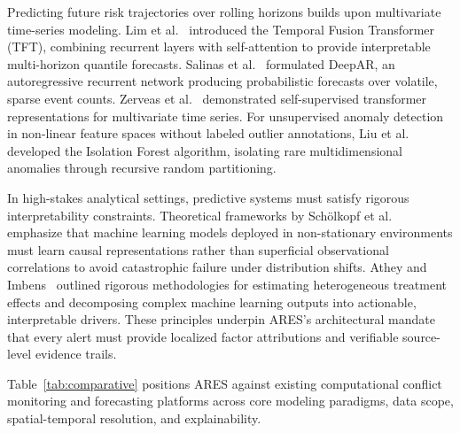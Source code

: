 \documentclass[preprint,12pt]{elsarticle}
\begin{document}
Predicting future risk trajectories over rolling horizons builds upon multivariate time-series modeling. Lim et al.~\cite{lim2021temporal} introduced the Temporal Fusion Transformer (TFT), combining recurrent layers with self-attention to provide interpretable multi-horizon quantile forecasts. Salinas et al.~\cite{salinas2020deepar} formulated DeepAR, an autoregressive recurrent network producing probabilistic forecasts over volatile, sparse event counts. Zerveas et al.~\cite{zerveas2021transformer} demonstrated self-supervised transformer representations for multivariate time series. For unsupervised anomaly detection in non-linear feature spaces without labeled outlier annotations, Liu et al.~\cite{liu2008isolation} developed the Isolation Forest algorithm, isolating rare multidimensional anomalies through recursive random partitioning.

In high-stakes analytical settings, predictive systems must satisfy rigorous interpretability constraints. Theoretical frameworks by Sch\"{o}lkopf et al.~\cite{scholkopf2021toward} emphasize that machine learning models deployed in non-stationary environments must learn causal representations rather than superficial observational correlations to avoid catastrophic failure under distribution shifts. Athey and Imbens~\cite{athey2022machine} outlined rigorous methodologies for estimating heterogeneous treatment effects and decomposing complex machine learning outputs into actionable, interpretable drivers. These principles underpin ARES's architectural mandate that every alert must provide localized factor attributions and verifiable source-level evidence trails.

Table~\ref{tab:comparative} positions ARES against existing computational conflict monitoring and forecasting platforms across core modeling paradigms, data scope, spatial-temporal resolution, and explainability.
\end{document}
